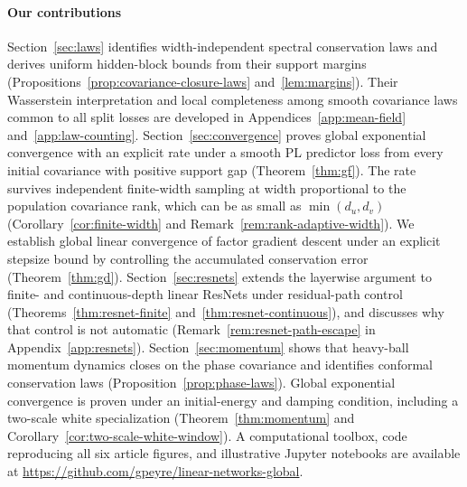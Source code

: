 \paragraph{Our contributions}
Section~\ref{sec:laws} identifies width-independent spectral conservation
laws and derives uniform hidden-block bounds from their support margins
(Propositions~\ref{prop:covariance-closure-laws} and~\ref{lem:margins}).
Their Wasserstein interpretation and local completeness among smooth covariance
laws common to all split losses are developed in
Appendices~\ref{app:mean-field} and~\ref{app:law-counting}.
Section~\ref{sec:convergence} proves global exponential convergence with an explicit rate under a smooth PL predictor loss from every initial covariance with positive
support gap (Theorem~\ref{thm:gf}).
The rate survives independent finite-width sampling at width proportional to the population covariance rank, which can be
as small as $\min(d_u,d_v)$ (Corollary~\ref{cor:finite-width} and
Remark~\ref{rem:rank-adaptive-width}).
We establish global linear convergence of factor
gradient descent under an explicit stepsize bound by controlling the
accumulated conservation error (Theorem~\ref{thm:gd}).
Section~\ref{sec:resnets} extends the layerwise argument to finite- and
continuous-depth linear ResNets under residual-path control
(Theorems~\ref{thm:resnet-finite} and~\ref{thm:resnet-continuous}), and
discusses why that control is not automatic (Remark~\ref{rem:resnet-path-escape}
in Appendix~\ref{app:resnets}).
Section~\ref{sec:momentum} shows that heavy-ball momentum dynamics closes on the phase covariance and identifies conformal conservation laws (Proposition~\ref{prop:phase-laws}).
Global exponential convergence is proven under an initial-energy
and damping condition, including a two-scale white specialization
(Theorem~\ref{thm:momentum} and Corollary~\ref{cor:two-scale-white-window}).
A computational toolbox, code reproducing all six article figures, and
illustrative Jupyter notebooks are available at
\url{https://github.com/gpeyre/linear-networks-global}.

